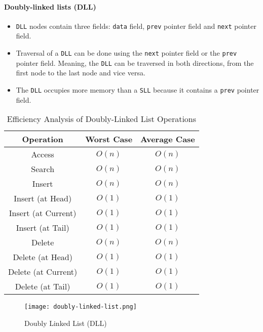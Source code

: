 \paragraph{Doubly-linked lists (DLL)}
\begin{itemize}
    \item \lstinline{DLL} nodes contain three fields: \lstinline{data} field, \lstinline{prev} pointer field and \lstinline{next} pointer field.
    \item Traversal of a \lstinline{DLL} can be done using the \lstinline{next} pointer field or the \lstinline{prev} pointer field. Meaning, the \lstinline{DLL} can be traversed in both directions, from the first node to the last node and vice versa.
    \item The \lstinline{DLL} occupies more memory than a \lstinline{SLL} because it contains a \lstinline{prev} pointer field.
\end{itemize}
\begin{table}[h]
    \centering
    \caption{Efficiency Analysis of Doubly-Linked List Operations}
    \label{tab:doubly-linked-list-efficiency-analysis}
    \begin{tabular}{|c|c|c|}
        \hline
        Operation           & Worst Case & Average Case \\ \hline
        Access              & $O(n)$     & $O(n)$       \\ \hline
        Search              & $O(n)$     & $O(n)$       \\ \hline
        Insert              & $O(n)$     & $O(n)$       \\ \hline
        Insert (at Head)    & $O(1)$     & $O(1)$       \\ \hline
        Insert (at Current) & $O(1)$     & $O(1)$       \\ \hline
        Insert (at Tail)    & $O(1)$     & $O(1)$       \\ \hline
        Delete              & $O(n)$     & $O(n)$       \\ \hline
        Delete (at Head)    & $O(1)$     & $O(1)$       \\ \hline
        Delete (at Current) & $O(1)$     & $O(1)$       \\ \hline
        Delete (at Tail)    & $O(1)$     & $O(1)$       \\ \hline
    \end{tabular}
\end{table}
\begin{figure}[!htbp]
    \centering
    \texttt{[image: doubly-linked-list.png]}
    \caption{Doubly Linked List (DLL) \cite{vaghani_2023}}
    \label{fig:doubly-linked-list}
\end{figure}
\newpage
% 
